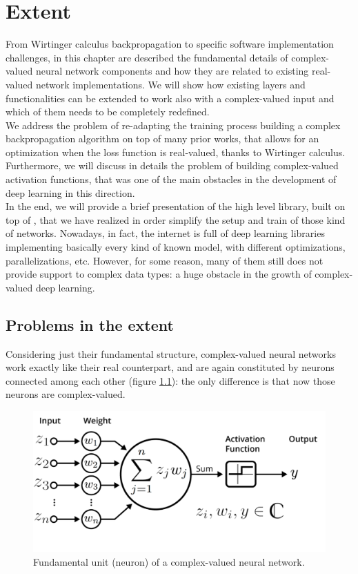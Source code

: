 \documentclass[../main.tex]{subfiles}
\begin{document}
	
\chapter{Extent}
\label{ch:extent}

From Wirtinger calculus backpropagation to specific software implementation challenges, in this chapter are described the fundamental details of
complex-valued neural network components and how they are related to existing real-valued network implementations. We will show how existing layers and functionalities can be extended to work also with a complex-valued input and which of them needs to be completely redefined.\\
We address the problem of re-adapting the training process building a complex backpropagation algorithm on top of many prior works, that allows for an optimization when the loss function is real-valued, thanks to Wirtinger calculus.\\
Furthermore, we will discuss in details the problem of building complex-valued activation functions, that was one of the main obstacles in the development of deep learning in this direction.\\
In the end, we will provide a brief presentation of the high level library, built on top of \JAX, that we have realized in order simplify the setup and train of those kind of networks. Nowadays, in fact, the internet is full of deep learning libraries implementing basically every kind of known model, with different optimizations, parallelizations, etc. However, for some reason, many of them still does not provide support to complex data types: a huge obstacle in the growth of complex-valued deep learning.


\section{Problems in the extent}
\label{sec:problems_extent}

Considering just their fundamental structure, complex-valued neural networks work exactly like their real counterpart, and are again constituted by neurons connected among each other (figure \ref{fig:cmplx_neuron}): the only difference is that now those neurons are complex-valued. 

\begin{figure}[!ht]
	\centering
	\includegraphics[scale=0.25]{pictures/complex_neuron}
	\caption{Fundamental unit (neuron) of a complex-valued neural network.}
	\label{fig:cmplx_neuron}
\end{figure}
\end{document}
